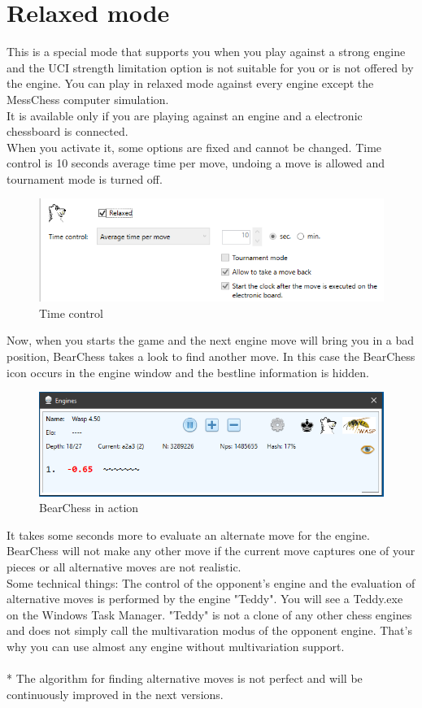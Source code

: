 \documentclass[11pt,a4paper]{article}
\begin{document}
\section{Relaxed mode} \label{RelaxedMode}
This is a special mode that supports you when you play against a strong engine and the UCI strength limitation option is not suitable for you or is not offered by the engine. You can play in relaxed mode against every engine except the MessChess computer simulation. \\
It is available only if you are playing against an engine and a electronic chessboard is connected.\\
When you activate it, some options are fixed and cannot be changed. Time control is 10 seconds average time per move, undoing a move is allowed and tournament mode is turned off.

\begin{figure}[H]
	\centering
	\includegraphics[scale=1.0]{relaxed1.png}
	\caption{Time control}
	\label{fig:Relaxed1}
\end{figure}

Now, when you starts the game and the next engine move will bring you in a bad position, BearChess takes a look to find another move. In this case the BearChess icon occurs in the engine window and the bestline information is hidden.

\begin{figure}[H]
	\centering
	\includegraphics[scale=0.8]{relaxed2.png}
	\caption{BearChess in action}
	\label{fig:Relaxed2}
\end{figure}
 It takes some seconds more to evaluate an alternate move for the engine. BearChess will not make any other move if the current move captures one of your pieces or all alternative moves 
 are not realistic.\\
Some technical things: The control of the opponent's engine and the evaluation of alternative moves is performed by the engine "Teddy". You will see a Teddy.exe on the Windows Task Manager.
"Teddy" is not a clone of any other chess engines and does not simply call the multivaration modus 
of the opponent engine. That's why you can use almost any engine without multivariation support.\\\\
{\color{red}*} The algorithm for finding alternative moves is not perfect and will be continuously improved in the next versions.
\end{document}
